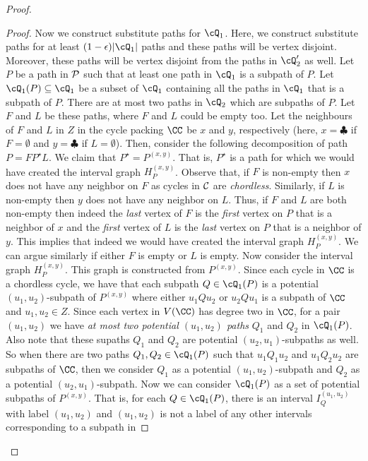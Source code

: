 \begin{proof}
\begin{proof}
Now we construct substitute paths for $\cQ_1$. Here, we construct substitute paths for at least $(1-{\epsilon})\vert \cQ_1\vert$ 
paths and these paths will be vertex disjoint. Moreover, these paths will be vertex disjoint from the paths in $\cQ_2'$ as well. 
Let $P$ be a path in ${\cal P}$ such that at least one path in $\cQ_1$ is a subpath of $P$. 
Let $\cQ_1(P)\subseteq \cQ_1$ be a subset of $\cQ_1$ containing all the paths in $\cQ_1$ that is a subpath of $P$. 
There are at most two paths in $\cQ_2$ which 
are subpaths of $P$. Let $F$ and $L$ be these paths, where $F$ and $L$ could be empty too. 
 Let the neighbours of $F$ and $L$ in $Z$ in the cycle packing $\CC$ be $x$ and $y$, respectively 
(here, $x=\clubsuit$ if $F=\emptyset$ and $y=\clubsuit$ if $L=\emptyset$).  
Then, consider the  following decomposition of path $P=FP^\star L$. We claim that $P^\star=P^{(x,y)}$. That is, $P^\star$ is a path for which we would have created the interval graph $H_P^{(x,y)}$.  
Observe that, if $F$ is non-empty then $x$  does not have any neighbor on $F$ as cycles in $\cal C$ are {\em chordless}. Similarly, if $L$ is non-empty then $y$ does not have any neighbor on $L$. 
Thus, if $F$ and $L$ are both non-empty then indeed the {\em last} vertex of $F$ is the {\em first}  vertex on $P$ that is a neighbor of $x$ and the {\em first} vertex of $L$ is the {\em last} vertex on $P$ that is a neighbor of $y$. This implies that indeed we would have created the interval graph $H_P^{(x,y)}$. We can argue similarly if either $F$ is empty or $L$ is empty.  
Now consider the interval graph $H_P^{(x,y)}$. This graph is constructed from $P^{(x,y)}$. 
Since 
each cycle in $\CC$ is a chordless cycle, we have that 
each subpath $Q\in \cQ_1(P)$ is a potential $(u_1,u_2)$-subpath of $P^{(x,y)}$ where 
either $u_1Qu_2$ or $u_2Qu_1$ is a subpath of $\CC$ and $u_1,u_2\in Z$.
Since each vertex in $V(\CC)$ has degree two in $\CC$, 
for a pair $(u_1,u_2)$ we have {\em at most two potential $(u_1,u_2)$ paths} 
$Q_1$ and $Q_2$ in $\cQ_1(P)$. Also note that these supaths $Q_1$ and $Q_2$ are 
potential $(u_2,u_1)$-subpaths as well. So when there are two paths $Q_1,Q_2\in \cQ_1(P)$ 
such that $u_1Q_1 u_2$ and $u_1 Q_2 u_2$ are subpaths of $\CC$, then we consider $Q_1$ 
as a potential $(u_1,u_2)$-subpath and $Q_2$ as  a potential $(u_2,u_1)$-subpath.  
Now we can consider $\cQ_1(P)$ as a set of potential subpaths of $P^{(x,y)}$. 
That is, for each 
$Q\in \cQ_1(P)$, there is an interval $I^{(u_1,u_2)}_Q$ with label $(u_1,u_2)$ 
and $(u_1,u_2)$ is not a label of any other intervals corresponding to a subpath in 

\end{proof}
\end{proof}
